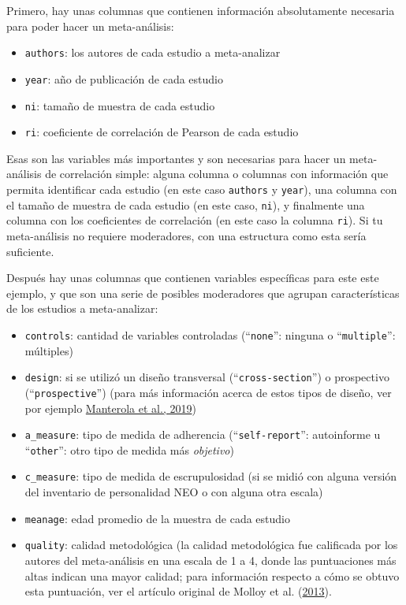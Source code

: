 \documentclass[
  bookmarksnumbered]{article}
\begin{document}
Primero, hay unas columnas que contienen información absolutamente necesaria para poder hacer un meta-análisis:

\begin{itemize}
\item
  \texttt{authors}: los autores de cada estudio a meta-analizar
\item
  \texttt{year}: año de publicación de cada estudio
\item
  \texttt{ni}: tamaño de muestra de cada estudio
\item
  \texttt{ri}: coeficiente de correlación de Pearson de cada estudio
\end{itemize}

Esas son las variables más importantes y son necesarias para hacer un meta-análisis de correlación simple: alguna columna o columnas con información que permita identificar cada estudio (en este caso \texttt{authors} y \texttt{year}), una columna con el tamaño de muestra de cada estudio (en este caso, \texttt{ni}), y finalmente una columna con los coeficientes de correlación (en este caso la columna \texttt{ri}). Si tu meta-análisis no requiere moderadores, con una estructura como esta sería suficiente.

Después hay unas columnas que contienen variables específicas para este este ejemplo, y que son una serie de posibles moderadores que agrupan características de los estudios a meta-analizar:

\begin{itemize}
\item
  \texttt{controls}: cantidad de variables controladas (``\texttt{none}'': ninguna o ``\texttt{multiple}'': múltiples)
\item
  \texttt{design}: si se utilizó un diseño transversal (``\texttt{cross-section}'') o prospectivo (``\texttt{prospective}'') (para más información acerca de estos tipos de diseño, ver por ejemplo \protect\hyperlink{ref-Manterola2019}{Manterola et al., 2019})
\item
  \texttt{a\_measure}: tipo de medida de adherencia (``\texttt{self-report}'': autoinforme u ``\texttt{other}'': otro tipo de medida más \emph{objetivo})
\item
  \texttt{c\_measure}: tipo de medida de escrupulosidad (si se midió con alguna versión del inventario de personalidad NEO o con alguna otra escala)
\item
  \texttt{meanage}: edad promedio de la muestra de cada estudio
\item
  \texttt{quality}: calidad metodológica (la calidad metodológica fue calificada por los autores del meta-análisis en una escala de 1 a 4, donde las puntuaciones más altas indican una mayor calidad; para información respecto a cómo se obtuvo esta puntuación, ver el artículo original de Molloy et al. (\protect\hyperlink{ref-molloy2013}{2013}).
\end{itemize}
\end{document}
